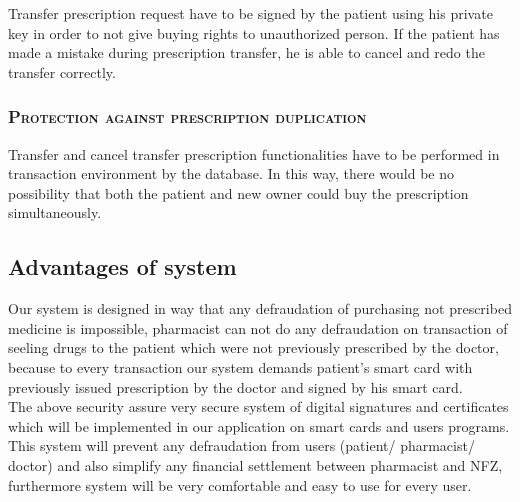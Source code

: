 \documentclass[12pt,titlepage]{article}
\begin{document}
Transfer prescription request have to be signed by the patient using his private key in order to not give buying rights to unauthorized person. If the patient has made a mistake during prescription transfer, he is able to cancel and redo the transfer correctly.

\subsubsection{\textsc{Protection against prescription duplication}}

Transfer and cancel transfer prescription functionalities have to be performed in transaction environment by the database. In this way, there would be no possibility that both the patient and new owner could buy the prescription simultaneously.


\subsection{Advantages of system}

Our system is designed in way that any defraudation of purchasing not prescribed medicine is impossible, pharmacist can not do any defraudation on transaction of seeling drugs to the patient which were not previously prescribed by the doctor, because to every transaction our system demands patient's smart card with previously issued prescription by the doctor and signed by his smart card.
\\

The above security assure very secure system of digital signatures and certificates which will be implemented in our application on smart cards and users programs. This system will prevent any defraudation from users (patient/ pharmacist/ doctor) and also simplify any financial settlement between pharmacist and NFZ, furthermore system will be very comfortable and easy to use for every user.
\end{document}
